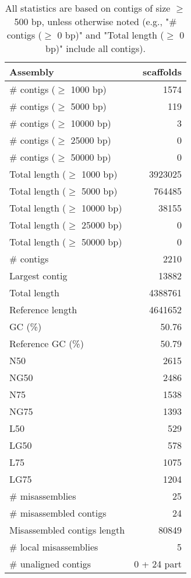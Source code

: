 \documentclass[12pt,a4paper]{article}
\begin{document}
\begin{table}[ht]
\begin{center}
\caption{All statistics are based on contigs of size $\geq$ 500 bp, unless otherwise noted (e.g., "\# contigs ($\geq$ 0 bp)" and "Total length ($\geq$ 0 bp)" include all contigs).}
\begin{tabular}{|l*{1}{|r}|}
\hline
Assembly & scaffolds \\ \hline
\# contigs ($\geq$ 1000 bp) & 1574 \\ \hline
\# contigs ($\geq$ 5000 bp) & 119 \\ \hline
\# contigs ($\geq$ 10000 bp) & 3 \\ \hline
\# contigs ($\geq$ 25000 bp) & 0 \\ \hline
\# contigs ($\geq$ 50000 bp) & 0 \\ \hline
Total length ($\geq$ 1000 bp) & 3923025 \\ \hline
Total length ($\geq$ 5000 bp) & 764485 \\ \hline
Total length ($\geq$ 10000 bp) & 38155 \\ \hline
Total length ($\geq$ 25000 bp) & 0 \\ \hline
Total length ($\geq$ 50000 bp) & 0 \\ \hline
\# contigs & 2210 \\ \hline
Largest contig & 13882 \\ \hline
Total length & 4388761 \\ \hline
Reference length & 4641652 \\ \hline
GC (\%) & 50.76 \\ \hline
Reference GC (\%) & 50.79 \\ \hline
N50 & 2615 \\ \hline
NG50 & 2486 \\ \hline
N75 & 1538 \\ \hline
NG75 & 1393 \\ \hline
L50 & 529 \\ \hline
LG50 & 578 \\ \hline
L75 & 1075 \\ \hline
LG75 & 1204 \\ \hline
\# misassemblies & 25 \\ \hline
\# misassembled contigs & 24 \\ \hline
Misassembled contigs length & 80849 \\ \hline
\# local misassemblies & 5 \\ \hline
\# unaligned contigs & 0 + 24 part \\ \hline

\end{tabular}
\end{center}
\end{table}
\end{document}
